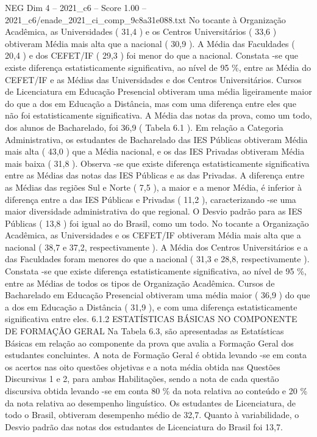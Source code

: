 \begin{textsample}{NEG Dim 4 – 2021\_c6 – Score 1.00 – 2021\_c6/enade\_2021\_ci\_comp\_9c8a31e088.txt}
No tocante à Organização Acadêmica, as Universidades ( 31,4 ) e os Centros Universitários ( 33,6 ) obtiveram Média mais alta que a nacional ( 30,9 ).
A Média das Faculdades ( 20,4 ) e dos CEFET/IF ( 29,3 ) foi menor do que a nacional.
Constata -se que existe diferença estatisticamente significativa, ao nível de 95 \%, entre as Média do CEFET/IF e as Médias das Universidades e dos Centros Universitários.
Cursos de Licenciatura em Educação Presencial obtiveram uma média ligeiramente maior do que a dos em Educação a Distância, mas com uma diferença entre eles que não foi estatisticamente significativa.
A Média das notas da prova, como um todo, dos alunos de Bacharelado, foi 36,9 ( Tabela 6.1 ).
Em relação a Categoria Administrativa, os estudantes de Bacharelado das IES Públicas obtiveram Média mais alta ( 43,0 ) que a Média nacional, e os das IES Privadas obtiveram Média mais baixa ( 31,8 ).
Observa -se que existe diferença estatisticamente significativa entre as Médias das notas das IES Públicas e as das Privadas.
A diferença entre as Médias das regiões Sul e Norte ( 7,5 ), a maior e a menor Média, é inferior à diferença entre a das IES Públicas e Privadas ( 11,2 ), caracterizando -se uma maior diversidade administrativa do que regional.
O Desvio padrão para as IES Públicas ( 13,8 ) foi igual ao do Brasil, como um todo.
No tocante a Organização Acadêmica, as Universidades e os CEFET/IF obtiveram Média mais alta que a nacional ( 38,7 e 37,2, respectivamente ).
A Média dos Centros Universitários e a das Faculdades foram menores do que a nacional ( 31,3 e 28,8, respectivamente ).
Constata -se que existe diferença estatisticamente significativa, ao nível de 95 \%, entre as Médias de todos os tipos de Organização Acadêmica.
Cursos de Bacharelado em Educação Presencial obtiveram uma média maior ( 36,9 ) do que a dos em Educação a Distância ( 31,9 ), e com uma diferença estatisticamente significativa entre eles. 6.1.2 ESTATÍSTICAS BÁSICAS NO COMPONENTE DE FORMAÇÃO GERAL Na Tabela 6.3, são apresentadas as Estatísticas Básicas em relação ao componente da prova que avalia a Formação Geral dos estudantes concluintes.
A nota de Formação Geral é obtida levando -se em conta os acertos nas oito questões objetivas e a nota média obtida nas Questões Discursivas 1 e 2, para ambas Habilitações, sendo a nota de cada questão discursiva obtida levando -se em conta 80 \% da nota relativa ao conteúdo e 20 \% da nota relativa ao desempenho linguístico.
Os estudantes de Licenciatura, de todo o Brasil, obtiveram desempenho médio de 32,7.
Quanto à variabilidade, o Desvio padrão das notas dos estudantes de Licenciatura do Brasil foi 13,7.

\end{textsample}
